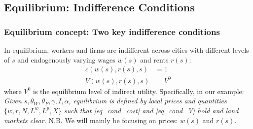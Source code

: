 \documentclass[10pt,notes=hide]{beamer}
\begin{document}
\subsection{Equilibrium: Indifference Conditions}
\begin{frame}
\frametitle{Equilibrium concept: Two key indifference conditions}
 In equilibrium, workers and firms are indifferent across cities with different levels of $s$ and endogenously varying wages $w(s)$ and rents $r(s)$:
\begin{align} 
c(w(s), r(s), s) &= 1 \label{eq_cond_cost} \\
V(w(s), r(s), s) &= V^0 \label{eq_cond_V}
\end{align}
where $V^0$ is the equilibrium level of indirect utility.
\bigskip
Specifically, in our example: \\
\textit{Given $s,\theta_W, \theta_F, \gamma, I, \alpha$, equilibrium is defined by local prices and quantities $\{w,r,N,L^w,L^p,X\}$ such that \eqref{eq_cond_cost} and \eqref{eq_cond_V} hold and land markets clear.}
\bigskip
N.B. We will mainly be focusing on prices: $w(s)$ and $r(s)$.
\end{frame}
\end{document}
